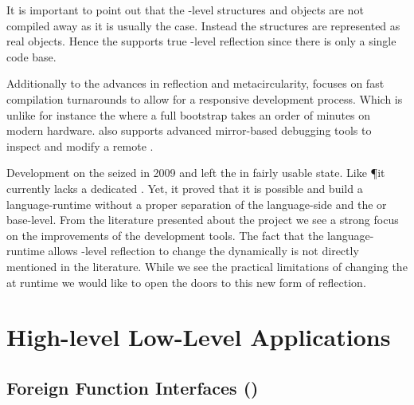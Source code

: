 It is important to point out that the \VM-level structures and objects are not compiled away as it is usually the case.
Instead the \VM structures are represented as real \Self objects.
Hence the \Klein \VM supports true \VM-level reflection since there is only a single code base.

Additionally to the advances in reflection and metacircularity, \Klein focuses on fast compilation turnarounds to allow for a responsive development process.
Which is unlike for instance the \Squeak \VM where a full \VM bootstrap takes an order of minutes on modern hardware.
\Klein also supports advanced mirror-based debugging tools to inspect and modify a remote \VM.

Development on the \Klein \VM seized in 2009 and left the \Klein \VM in fairly usable state.
Like \P it currently lacks a dedicated \GC.
Yet, it proved that it is possible and build a language-runtime without a proper separation of the language-side and the \VM or base-level.
From the literature presented about the \Klein project we see a strong focus on the improvements of the development tools.
The fact that the language-runtime allows \VM-level reflection to change the \VM dynamically is not directly mentioned in the literature.
While we see the practical limitations of changing the \VM at runtime we would like to open the doors to this new form of reflection.


\section{High-level Low-Level Applications}
\subsection{Foreign Function Interfaces (\FFI)}


